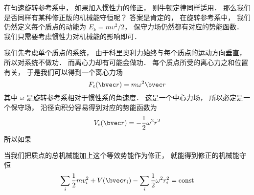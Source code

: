

在匀速旋转参考系中， 如果加入惯性力的修正， 则牛顿定律同样适用． 那么我们是否同样有某种修正版的机械能守恒呢？ 答案是肯定的， 在旋转参考系中， 我们仍然定义每个质点的动能为 $E_k = mv^2/2$， 保守力场仍然都有对应的势能函数． 我们只需要考虑惯性力对机械能的影响即可．

我们先考虑单个质点的系统， 由于科里奥利力始终与每个质点的运动方向垂直， 所以对系统不做功． 而离心力却有可能会做功． 每个质点所受的离心力之和位置有关， 于是我们可以得到一个离心力场
\begin{equation}
F_c(\bvec r) = m\omega^2 \bvec r
\end{equation}
其中 $\omega$ 是旋转参考系相对于惯性系的角速度． 这是一个中心力场， 所以必定是一个保守场， 沿径向积分容易得到对应的势能函数为
\begin{equation}
V_c(\bvec r) = -\frac{1}{2}\omega^2 r^2
\end{equation}
所以如果

当我们把质点的总机械能加上这个等效势能作为修正， 就能得到修正的机械能守恒
\begin{equation}
\sum_i \frac{1}{2}m v_i^2 + V(\bvec r_i) - \sum_i\frac{1}{2}\omega^2 r_i^2 = \text{const}
\end{equation}
